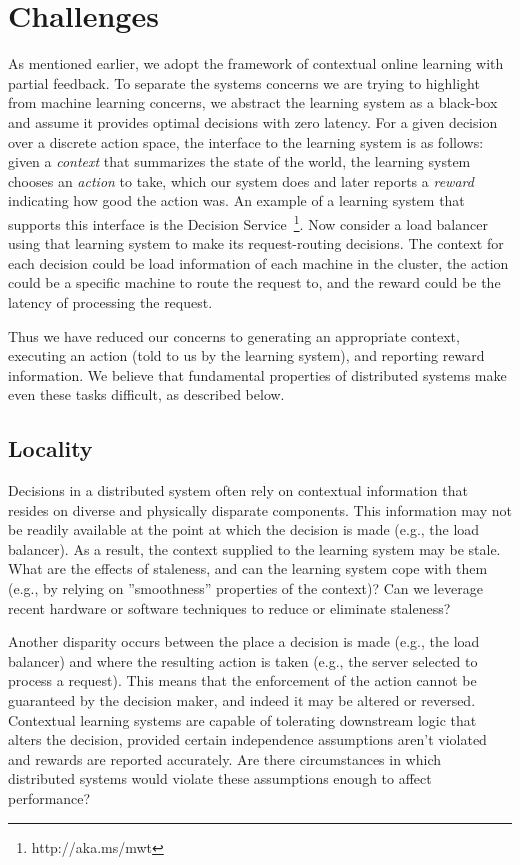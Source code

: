 \documentclass[a4paper,twocolumn]{article}
\begin{document}
\section{Challenges}

As mentioned earlier, we adopt the framework of contextual online learning with
partial feedback.  To separate the systems concerns we are trying to highlight
from machine learning concerns, we abstract the learning system as a black-box
and assume it provides optimal decisions with zero latency. For a given decision
over a discrete action space, the interface to the learning system is as
follows: given a {\em context} that summarizes the state of the world, the
learning system chooses an {\em action} to take, which our system does and later
reports a {\em reward} indicating how good the action was. An example of a
learning system that supports this interface is the Decision
Service~\footnote{http://aka.ms/mwt}. Now consider a load balancer using that
learning system to make its request-routing decisions. The context for each
decision could be load information of each machine in the cluster, the action
could be a specific machine to route the request to, and the reward could be the
latency of processing the request.

Thus we have reduced our concerns to generating an appropriate context,
executing an action (told to us by the learning system), and reporting reward
information.  We believe that fundamental properties of distributed systems make
even these tasks difficult, as described below.

\subsection*{Locality}

Decisions in a distributed system often rely on contextual information that
resides on diverse and physically disparate components. This information may not
be readily available at the point at which the decision is made (e.g., the load
balancer).  As a result, the context supplied to the learning system may be
stale. What are the effects of staleness, and can the learning system cope with
them (e.g., by relying on ''smoothness'' properties of the context)?  Can we
leverage recent hardware or software techniques to reduce or eliminate
staleness?

Another disparity occurs between the place a decision is made (e.g., the load
balancer) and where the resulting action is taken (e.g., the server selected to
process a request). This means that the enforcement of the action cannot be
guaranteed by the decision maker, and indeed it may be altered or reversed.
Contextual learning systems are capable of tolerating downstream logic
that alters the decision, provided certain independence assumptions
aren't violated and rewards are reported accurately. Are there circumstances in
which distributed systems would violate these assumptions enough to affect
performance?
\end{document}
